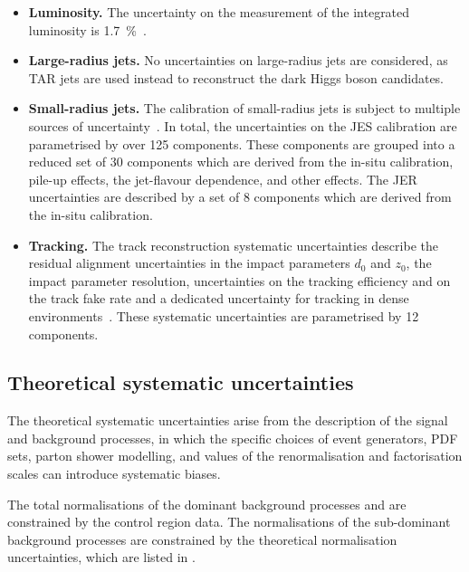 \begin{itemize}
  \item \textbf{Luminosity.} The uncertainty on the measurement of the integrated luminosity is \SI{1.7}{\percent}~\cite{ATLAS-CONF-2019-021}.
  \item \textbf{Large-radius jets.} No uncertainties on large-radius jets are considered, as TAR jets are used instead to reconstruct the dark Higgs boson candidates.
  \item \textbf{Small-radius jets.} The calibration of small-radius jets is subject to multiple sources of uncertainty~\cite{PERF-2016-04}. In total, the uncertainties on the JES calibration are parametrised by over 125 components. These components are grouped into a reduced set of 30 components which are derived from the in-situ calibration, pile-up effects, the jet-flavour dependence, and other effects. The JER uncertainties are described by a set of 8 components which are derived from the in-situ calibration.
  \item \textbf{Tracking.} The track reconstruction systematic uncertainties describe the residual alignment uncertainties in the impact parameters \(d_{0}\) and \(z_{0}\), the impact parameter resolution, uncertainties on the tracking efficiency and on the track fake rate and a dedicated uncertainty for tracking in dense environments~\cite{ATL-PHYS-PUB-2015-051}. These systematic uncertainties are parametrised by 12 components.
\end{itemize}

\subsection{Theoretical systematic uncertainties}
\label{sec:monoSVV:systematics:theoretical}
The theoretical systematic uncertainties arise from the description of the signal and background processes, in which the specific choices of event generators, PDF sets, parton shower modelling, and values of the renormalisation and factorisation scales can introduce systematic biases.

The total normalisations of the dominant background processes \zjets and \wjets are constrained by the control region data.
The normalisations of the sub-dominant background processes are constrained by the theoretical normalisation uncertainties, which are listed in .

